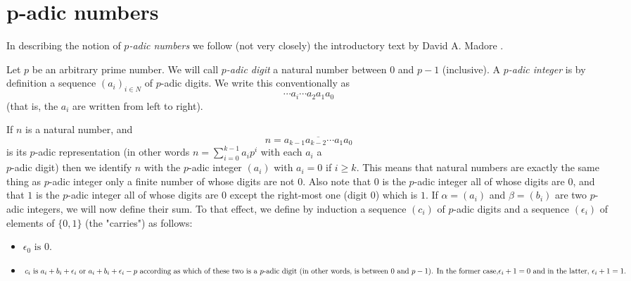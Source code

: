 \documentclass{llncs}
\begin{document}
\section{p-adic numbers} 

In describing the notion of {\em $p$-adic numbers} we follow (not very closely) the introductory text by David A. Madore \cite{M00}. 

Let $p$ be an arbitrary prime number.
We will call {\em $p$-adic digit} a natural number between $0$ and $p-1$ (inclusive). A
{\em $p$-adic integer} is by definition a sequence $(a_i)_{i \in N}$ of $p$-adic digits. We write this
conventionally as
$$
\cdots a_i \cdots  a_2 a_1 a_0
$$
(that is, the $a_i$ are written from left to right).

If $n$ is a natural number, and
$$
n = \overline{a_{k-1} a_{k-2} \cdots  a_1 a_0}
$$
is its $p$-adic representation (in other words 
$n = \sum ^{k-1}_{i=0}  a_ip^i$ with each $a_i$ a\\ $p$-adic
digit) then we identify $n$ with the $p$-adic integer $(a_i)$ with $a_i = 0$ if $i \geq k$. This
means that natural numbers are exactly the same thing as $p$-adic integer only a
finite number of whose digits are not $0$. Also note that $0$ is the $p$-adic integer all of
whose digits are $0$, and that $1$ is the $p$-adic integer all of whose digits are $0$ except
the right-most one (digit $0$) which is $1$.
If $\alpha  = (a_i)$ and $\beta = (b_i)$ are two $p$-adic integers, we will now define their
sum. To that effect, we define by induction a sequence $(c_i)$ of $p$-adic digits and a
sequence $(\epsilon _i)$ of elements of $\{0, 1\}$ (the "carries") as follows:\\


\begin{itemize}
  \item  $\epsilon _0 \mbox{ is } 0.$\\
  \item  $c_i \mbox{ is } a_i + b_i + \epsilon _i \mbox{ or } a_i + b_i + \epsilon _i - p \mbox{ according as which of these two is a }\\
p\mbox{-adic digit (in other words, is between $0$ and $p - 1$). In the former case,}\\
\epsilon _i+1 = 0 \mbox{ and in the latter, } \epsilon _i+1 = 1.$
\end{itemize}
\end{document}

